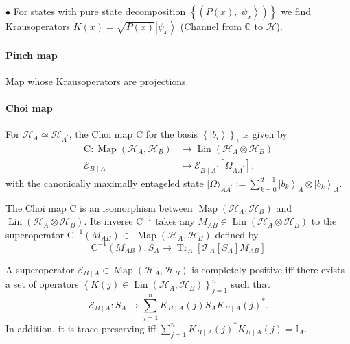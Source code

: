 $\bullet$ For states with pure state decomposition $\left\{\left(P(x),\left|\psi_x\right\rangle\right)\right\}$ we find Krausoperators $K(x)=\sqrt{P(x)}\left|\psi_x\right\rangle$
(Channel from $\mathbb{C}$ to $\mathcal{H}$).

\paragraph{Pinch map} Map whose Krausoperators are projections.

\paragraph{Choi map} For $\mathcal{H}_A \simeq \mathcal{H}_{A^{\prime}}$, the Choi map $\mathrm{C}$ for the basis $\left\{\left|b_i\right\rangle\right\}_i$ is given by
$$
\begin{aligned}
\mathrm{C}: \operatorname{Map}\left(\mathcal{H}_A, \mathcal{H}_B\right) & \rightarrow \operatorname{Lin}\left(\mathcal{H}_A \otimes \mathcal{H}_B\right) \\
\mathcal{E}_{B \mid A} & \mapsto \mathcal{E}_{B \mid A^{\prime}}\left[\Omega_{A A^{\prime}}\right] .
\end{aligned}
$$ with the canonically maximally entageled state $|\Omega\rangle_{A A^{\prime}}:=\sum_{k=0}^{d-1}\left|b_k\right\rangle_A \otimes\left|b_k\right\rangle_A$.

\begin{theorem}
The Choi map C is an isomorphism between $\operatorname{Map}\left(\mathcal{H}_A, \mathcal{H}_B\right)$ and $\operatorname{Lin}\left(\mathcal{H}_A \otimes \mathcal{H}_B\right)$. Its inverse $\mathrm{C}^{-1}$ takes any $M_{A B} \in \operatorname{Lin}\left(\mathcal{H}_A \otimes \mathcal{H}_B\right)$ to the superoperator $\mathrm{C}^{-1}\left(M_{A B}\right) \in$ $\operatorname{Map}\left(\mathcal{H}_A, \mathcal{H}_B\right)$ defined by
$$
\mathrm{C}^{-1}\left(M_{A B}\right): S_A \mapsto \operatorname{Tr}_A\left[\mathcal{T}_A\left[S_A\right] M_{A B}\right]
$$
\end{theorem}

\begin{theorem}
A superoperator $\mathcal{E}_{B \mid A} \in \operatorname{Map}\left(\mathcal{H}_A, \mathcal{H}_B\right)$ is completely positive iff there exists a set of operators $\left\{K(j) \in \operatorname{Lin}\left(\mathcal{H}_A, \mathcal{H}_B\right)\right\}_{j=1}^n$ such that
$$
\mathcal{E}_{B \mid A}: S_A \mapsto \sum_{j=1}^n K_{B \mid A}(j) S_A K_{B \mid A}(j)^* .
$$
In addition, it is trace-preserving iff $\sum_{j=1}^n K_{B \mid A}(j)^* K_{B \mid A}(j)=\mathbb{I}_A$.
\end{theorem}

